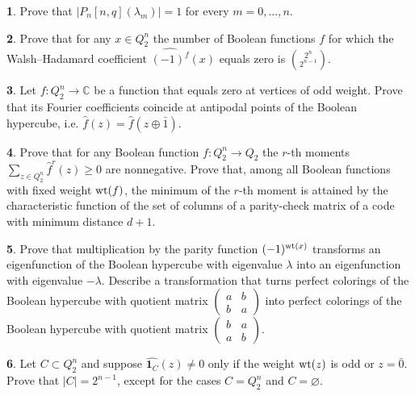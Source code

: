 \documentclass[11pt]{article}
\theoremstyle{definition}
\newtheorem{exercise}{\quad}
\newcommand{\wt}{{\rm wt}}
\begin{document}
{{{\begin{exercise}\label{ex:Pnn}
Prove that $|P_n[n,q](\lambda_m)|=1$ for every $m=0,\dots,n$.
\end{exercise}

\begin{exercise}
Prove that for any $x\in Q_2^n$ the number of Boolean functions $f$ for which the Walsh--Hadamard coefficient $\widehat{(-1)^f}(x)$ equals zero is ${2^n \choose 2^{n-1}}$.
\end{exercise}

\begin{exercise}
Let $f:Q_2^n\rightarrow\mathbb{C}$ be a function that equals zero at vertices of odd weight. Prove that its Fourier coefficients coincide at antipodal points of the Boolean hypercube, i.e. $\widehat{f}(z)=\widehat{f}(z\oplus\bar{1})$.
\end{exercise}

\begin{exercise}
Prove that for any Boolean function $f:Q_2^n\rightarrow Q_2$ the $r$-th moments $\sum\limits_{z\in Q_2^n}\widehat{f}^r(z)\geq 0$ are nonnegative. 
Prove that, among all Boolean functions with fixed weight $\wt(f)$, the minimum of the $r$-th moment is attained by the characteristic function of the set of columns of a parity-check matrix of a code with minimum distance $d+1$.
\end{exercise}

\begin{exercise}
Prove that multiplication by the parity function $(-1)^{\wt (x)}$ transforms an eigenfunction of the Boolean hypercube with eigenvalue $\lambda$ into an eigenfunction with eigenvalue $-\lambda$.
Describe a transformation that turns perfect colorings of the Boolean hypercube with quotient matrix $\begin{pmatrix}
a & b\\
b & a
\end{pmatrix}$
into perfect colorings of the Boolean hypercube with quotient matrix
$\begin{pmatrix}
b & a\\
a & b
\end{pmatrix}$.
\end{exercise}

\begin{exercise}
Let $C\subset Q^n_2$ and suppose $\widehat{{\mathbf 1}_{C}}(z)\neq 0$ only if the weight $\wt(z)$ is odd or $z=\bar{0}$. Prove that $|C|=2^{n-1}$, except for the cases $C=Q^n_2$ and $C=\varnothing$.
\end{exercise}

}}}
\end{document}
